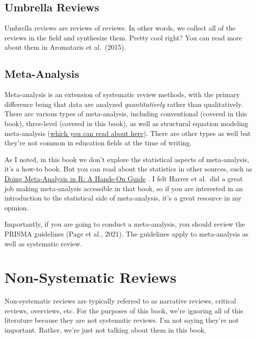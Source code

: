 \documentclass[
]{book}
\begin{document}
\hypertarget{umbrella-reviews}{%
\subsection{Umbrella Reviews}\label{umbrella-reviews}}

Umbrella reviews are reviews of reviews. In other words, we collect all of the reviews in the field and synthesize them. Pretty cool right? You can read more about them in Aromataris et al.~(2015)\citep{aromataris2015}.

\hypertarget{meta-analysis}{%
\subsection{Meta-Analysis}\label{meta-analysis}}

Meta-analysis is an extension of systematic review methods, with the primary difference being that data are analyzed \emph{quantitatively} rather than qualitatively. There are various types of meta-analysis, including conventional (covered in this book), three-level (covered in this book), as well as structural equation modeling meta-analysis (\href{http://www.suzannejak.nl/MASEM_SJak.pdf}{which you can read about here}). There are other types as well but they're not common in education fields at the time of writing.

As I noted, in this book we don't explore the statistical aspects of meta-analysis, it's a how-to book. But you can read about the statistics in other sources, such as \href{https://bookdown.org/MathiasHarrer/Doing_Meta_Analysis_in_R/}{Doing Meta-Analysis in R: A Hands-On Guide} \citep{harrer2021}. I felt Harrer et al.~did a great job making meta-analysis accessible in that book, so if you are interested in an introduction to the statistical side of meta-analysis, it's a great resource in my opinion.

Importantly, if you are going to conduct a meta-analysis, you should review the PRISMA guidelines (Page et al., 2021)\citep{page2021}. The guidelines apply to meta-analysis as well as systematic review.

\hypertarget{non-systematic-reviews}{%
\section{Non-Systematic Reviews}\label{non-systematic-reviews}}

Non-systematic reviews are typically referred to as narrative reviews, critical reviews, overviews, etc. For the purposes of this book, we're ignoring all of this literature because they are not systematic reviews. I'm not saying they're not important. Rather, we're just not talking about them in this book.
\end{document}
